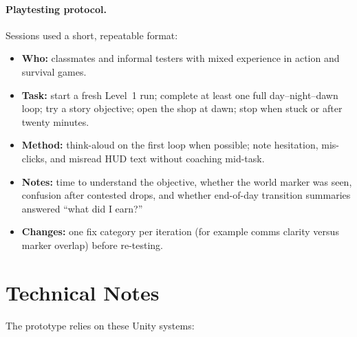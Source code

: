 \documentclass[11pt]{article}
\begin{document}
\paragraph{Playtesting protocol.}
Sessions used a short, repeatable format:

\begin{itemize}
    \item \textbf{Who:} classmates and informal testers with mixed experience in action and survival games.
    \item \textbf{Task:} start a fresh Level~1 run; complete at least one full day--night--dawn loop; try a story objective; open the shop at dawn; stop when stuck or after twenty minutes.
    \item \textbf{Method:} think-aloud on the first loop when possible; note hesitation, mis-clicks, and misread HUD text without coaching mid-task.
    \item \textbf{Notes:} time to understand the objective, whether the world marker was seen, confusion after contested drops, and whether end-of-day transition summaries answered ``what did I earn?''
    \item \textbf{Changes:} one fix category per iteration (for example comms clarity versus marker overlap) before re-testing.
\end{itemize}

\section{Technical Notes}\label{sec:technical}

The prototype relies on these Unity systems:
\end{document}
